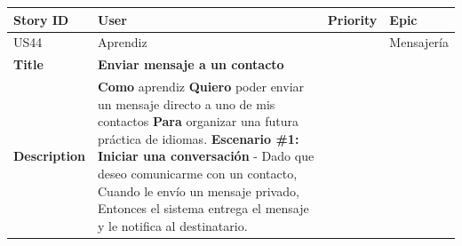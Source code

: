 {\def\LTcaptype{none} %
\begin{longtable}[]{@{}
  >{\raggedright\arraybackslash}p{}
  >{\raggedright\arraybackslash}p{}
  >{\raggedright\arraybackslash}p{}
  >{\raggedright\arraybackslash}p{}@{}}
\toprule\noalign{}
\begin{minipage}[b]{\linewidth}\raggedright
Story ID
\end{minipage} & \begin{minipage}[b]{\linewidth}\raggedright
User
\end{minipage} & \begin{minipage}[b]{\linewidth}\raggedright
Priority
\end{minipage} & \begin{minipage}[b]{\linewidth}\raggedright
Epic
\end{minipage} \\
\midrule\noalign{}
\endhead
\bottomrule\noalign{}
\endlastfoot
US44 & Aprendiz & 5 & Mensajería \\
\textbf{Title} & \textbf{Enviar mensaje a un contacto} & & \\
\textbf{Description} & \textbf{Como} aprendiz \textbf{Quiero} poder
enviar un mensaje directo a uno de mis contactos \textbf{Para} organizar
una futura práctica de idiomas. \textbf{Escenario \#1: Iniciar una
conversación} - Dado que deseo comunicarme con un contacto, Cuando le
envío un mensaje privado, Entonces el sistema entrega el mensaje y le
notifica al destinatario. & & \\
\end{longtable}
}

